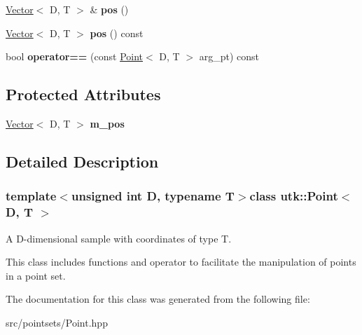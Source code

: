\begin{DoxyCompactItemize}
\item 
\hypertarget{classutk_1_1Point_a7a8ced7f77049fac274e496e69edc2cd}{\hyperlink{classutk_1_1Vector}{Vector}$<$ D, T $>$ \& {\bfseries pos} ()}\label{classutk_1_1Point_a7a8ced7f77049fac274e496e69edc2cd}

\item 
\hypertarget{classutk_1_1Point_a093be2f178e1b34e1ec026801cfb0b2f}{\hyperlink{classutk_1_1Vector}{Vector}$<$ D, T $>$ {\bfseries pos} () const }\label{classutk_1_1Point_a093be2f178e1b34e1ec026801cfb0b2f}

\item 
\hypertarget{classutk_1_1Point_a39138843aa2dc8e07f1a9b7b9e3c7a25}{bool {\bfseries operator==} (const \hyperlink{classutk_1_1Point}{Point}$<$ D, T $>$ arg\-\_\-pt) const }\label{classutk_1_1Point_a39138843aa2dc8e07f1a9b7b9e3c7a25}

\end{DoxyCompactItemize}
\subsection*{Protected Attributes}
\begin{DoxyCompactItemize}
\item 
\hypertarget{classutk_1_1Point_a086a258e984bb353117faf9ea1f4fe78}{\hyperlink{classutk_1_1Vector}{Vector}$<$ D, T $>$ {\bfseries m\-\_\-pos}}\label{classutk_1_1Point_a086a258e984bb353117faf9ea1f4fe78}

\end{DoxyCompactItemize}


\subsection{Detailed Description}
\subsubsection*{template$<$unsigned int D, typename T$>$class utk\-::\-Point$<$ D, T $>$}

A D-\/dimensional sample with coordinates of type T. 

This class includes functions and operator to facilitate the manipulation of points in a point set. 

The documentation for this class was generated from the following file\-:\begin{DoxyCompactItemize}
\item 
src/pointsets/Point.\-hpp\end{DoxyCompactItemize}
